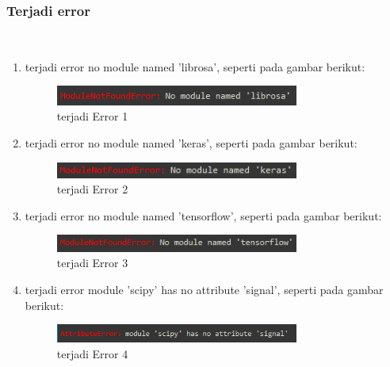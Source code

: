 \subsubsection{Terjadi error}
\hfill\\
\begin{enumerate}
\item terjadi error no module named 'librosa', seperti pada gambar berikut:
\begin{figure}[H]
	\centering
	\includegraphics[width=8cm]{figures/1174083/figures6/error1.png}
	\caption{terjadi Error 1}
\end{figure}

\item terjadi error no module named 'keras', seperti pada gambar berikut:
\begin{figure}[H]
	\centering
	\includegraphics[width=8cm]{figures/1174083/figures6/error2.png}
	\caption{terjadi Error 2}
\end{figure}

\item terjadi error no module named 'tensorflow', seperti pada gambar berikut:
\begin{figure}[H]
	\centering
	\includegraphics[width=8cm]{figures/1174083/figures6/error3.png}
	\caption{terjadi Error 3}
\end{figure}

\item terjadi error module 'scipy' has no attribute 'signal', seperti pada gambar berikut:
\begin{figure}[H]
	\centering
	\includegraphics[width=8cm]{figures/1174083/figures6/error4.png}
	\caption{terjadi Error 4}
\end{figure}
\end{enumerate}

